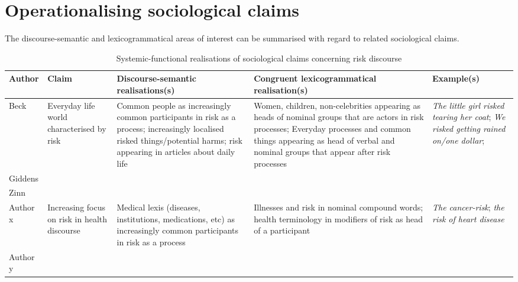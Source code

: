 




			\section{Operationalising sociological claims}

			The discourse-semantic and lexicogrammatical areas of interest can be summarised with regard to related sociological claims.

				\begin{table}
				\centering
				\footnotesize
				\begin{tabularx}{1.0\textwidth}{|l|X|X|X|X|}
				\hline
				\textbf{Author}   & \textbf{Claim}   & \textbf{Discourse-semantic realisations(s)}      & \textbf{Congruent lexicogrammatical realisation(s)}    & \textbf{Example(s)}  \\ \hline
				Beck     & Everyday life world characterised by risk    & Common people as increasingly common participants in risk as a process; increasingly localised risked things/potential harms; risk appearing in articles about daily life & Women, children, non-celebrities appearing as heads of nominal groups that are actors in risk processes; Everyday processes and common things appearing as head of verbal and nominal groups that appear after risk processes & \emph{The little girl risked tearing her coat}; \emph{We risked getting rained on/one dollar}; \\ \hline
				Giddens  & ~ & ~    & ~       & ~       \\ \hline
				Zinn     & ~     & ~      & ~       & ~    \\ \hline
				Author x & Increasing focus on risk in health discourse & Medical lexis (diseases, institutions, medications, etc) as increasingly common participants in risk as a process                                                         & Illnesses and risk in nominal compound words; health terminology in modifiers of risk as head of a participant    & \emph{The cancer-risk}; \emph{the risk of heart disease}                                       \\ \hline
				Author y & ~     & ~       & ~       & ~      \\ \hline
				\end{tabularx}
				\caption{Systemic-functional realisations of sociological claims concerning risk discourse}
				\label{tab:claims}
				\end{table}

